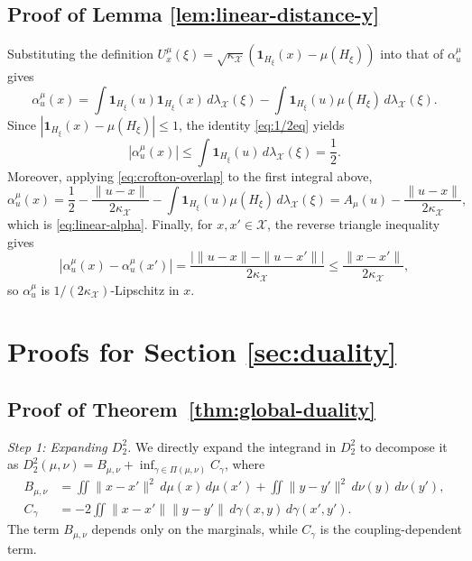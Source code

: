 \documentclass[11pt]{amsart}
\theoremstyle{definition}
\theoremstyle{remark}
\newcommand{\1}{\mathbf{1}}
\numberwithin{equation}{section}
\begin{document}
\subsection{Proof of Lemma \ref{lem:linear-distance-y}}
\label{pf:linear-distance-y}
Substituting the definition
$U_x^\mu(\xi)=\sqrt{\kappa_{\mathcal X}}(\1_{H_\xi}(x)-\mu(H_\xi))$ into that
of $\alpha_u^\mu$ gives
\[
\alpha_u^\mu(x)
=\int \1_{H_\xi}(u)\1_{H_\xi}(x)\,d\lambda_{\mathcal X}(\xi)
-\int \1_{H_\xi}(u)\mu(H_\xi)\,d\lambda_{\mathcal X}(\xi).
\]
Since $|\1_{H_\xi}(x)-\mu(H_\xi)|\le 1$, the identity \eqref{eq:1/2eq} yields
\[
|\alpha_u^\mu(x)|
\le\int \1_{H_\xi}(u)\,d\lambda_{\mathcal X}(\xi)
=\frac12.
\]
Moreover, applying \eqref{eq:crofton-overlap} to the first integral above,
\[
\alpha_u^\mu(x)
=\frac12-\frac{\|u-x\|}{2\kappa_{\mathcal X}}
-\int \1_{H_\xi}(u)\mu(H_\xi)\,d\lambda_{\mathcal X}(\xi)
=A_\mu(u)-\frac{\|u-x\|}{2\kappa_{\mathcal X}},
\]
which is \eqref{eq:linear-alpha}. Finally, for $x,x'\in\mathcal X$, the
reverse triangle inequality gives
\[
|\alpha_u^\mu(x)-\alpha_u^\mu(x')|
=\frac{\bigl|\|u-x\|-\|u-x'\|\bigr|}{2\kappa_{\mathcal X}}
\le\frac{\|x-x'\|}{2\kappa_{\mathcal X}},
\]
so $\alpha_u^\mu$ is $1/(2\kappa_{\mathcal X})$-Lipschitz in $x$.

\section{Proofs for Section \ref{sec:duality}}
\label{appendix:proofs-duality}

\subsection{Proof of Theorem~\ref{thm:global-duality}}
\label{pf:global-duality-proof}

\emph{Step 1: Expanding $D_2^2$.}
We directly expand the integrand in $D_2^2$ to decompose it as
$D_2^2(\mu,\nu)
=
B_{\mu,\nu}
+
\inf_{\gamma\in\Pi(\mu,\nu)}C_\gamma$, where
\begin{align*}
B_{\mu,\nu}
&=
\iint \|x-x'\|^2\,d\mu(x)\,d\mu(x')
+
\iint \|y-y'\|^2\,d\nu(y)\,d\nu(y'),\\
C_\gamma
&=
-2\iint
\|x-x'\|\|y-y'\|
\,d\gamma(x,y)\,d\gamma(x',y').
\end{align*}
The term $B_{\mu,\nu}$ depends only on the marginals, while $C_\gamma$
is the coupling-dependent term.
\end{document}
